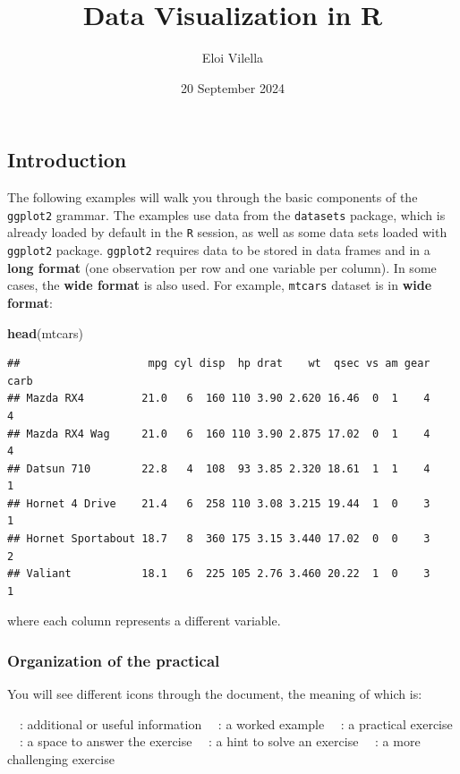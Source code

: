 \documentclass[
]{article}
\title{\textbf{Data Visualization in R}}
\author{Eloi Vilella}
\date{20 September 2024}
\newenvironment{Shaded}{\begin{snugshade}}{\end{snugshade}}
\newcommand{\FunctionTok}[1]{\textcolor[rgb]{0.13,0.29,0.53}{\textbf{#1}}}
\newcommand{\NormalTok}[1]{#1}
\begin{document}
\maketitle

{
\setcounter{tocdepth}{2}
\tableofcontents
}
\subsection{Introduction}\label{introduction}

The following examples will walk you through the basic components of the
\texttt{ggplot2} grammar. The examples use data from the
\texttt{datasets} package, which is already loaded by default in the
\texttt{R} session, as well as some data sets loaded with
\texttt{ggplot2} package. \texttt{ggplot2} requires data to be stored in
data frames and in a \textbf{long format} (one observation per row and
one variable per column). In some cases, the \textbf{wide format} is
also used. For example, \texttt{mtcars} dataset is in \textbf{wide
format}:

\begin{Shaded}
\begin{Highlighting}[]
\FunctionTok{head}\NormalTok{(mtcars)}
\end{Highlighting}
\end{Shaded}

\begin{verbatim}
##                    mpg cyl disp  hp drat    wt  qsec vs am gear carb
## Mazda RX4         21.0   6  160 110 3.90 2.620 16.46  0  1    4    4
## Mazda RX4 Wag     21.0   6  160 110 3.90 2.875 17.02  0  1    4    4
## Datsun 710        22.8   4  108  93 3.85 2.320 18.61  1  1    4    1
## Hornet 4 Drive    21.4   6  258 110 3.08 3.215 19.44  1  0    3    1
## Hornet Sportabout 18.7   8  360 175 3.15 3.440 17.02  0  0    3    2
## Valiant           18.1   6  225 105 2.76 3.460 20.22  1  0    3    1
\end{verbatim}

where each column represents a different variable.

\subsubsection{Organization of the
practical}\label{organization-of-the-practical}

You will see different icons through the document, the meaning of which
is:

 : additional or useful information  : a worked example  : a practical
exercise  : a space to answer the exercise  : a hint to solve an
exercise  : a more challenging exercise
\end{document}
